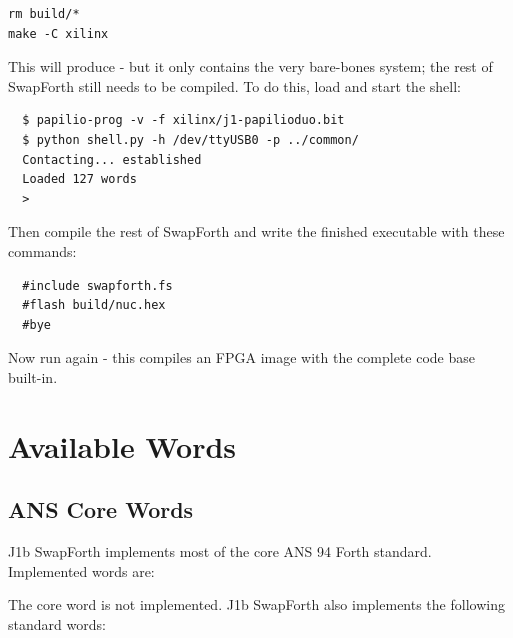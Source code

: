 \begin{Verbatim}
rm build/*
make -C xilinx
\end{Verbatim}

\noindent
This will produce  - but it only contains the very bare-bones system;
the rest of SwapForth still needs to be compiled.
To do this, load  and start the shell:

\begin{framed}
\begin{Verbatim}
  $ papilio-prog -v -f xilinx/j1-papilioduo.bit
  $ python shell.py -h /dev/ttyUSB0 -p ../common/
  Contacting... established
  Loaded 127 words
  >
\end{Verbatim}
\end{framed}

Then compile the rest of SwapForth and write the finished executable with these commands:

\begin{framed}
\begin{Verbatim}
  #include swapforth.fs
  #flash build/nuc.hex
  #bye
\end{Verbatim}
\end{framed}

Now run  again - this compiles an FPGA image with the complete code base built-in.


\chapter{Available Words}

\section{ANS Core Words} 

J1b SwapForth implements most of the core ANS 94 Forth standard.
Implemented words are:



\noindent
The core word
is not implemented.
J1b SwapForth also implements the following standard words:

